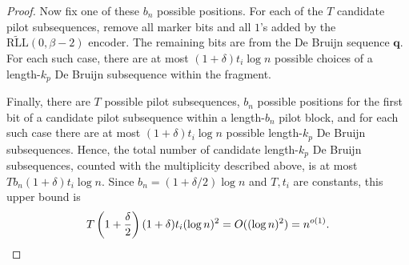 \documentclass[journal,letterpaper,onecolumn,11pt]{IEEEtran}
\newcommand{\boldq}{\mathbf{q}}
\begin{document}
\begin{proof}
Now fix one of these \(b_n\) possible positions.
For each of the \(T\) candidate pilot subsequences, remove all marker
bits and all \(1\)'s added by the
\(\widetilde{\mathrm{RLL}}(0,\beta-2)\) encoder.
The remaining bits are from the De Bruijn sequence \(\boldq\).
For each such case, there are at most
\((1+\delta)t_i\log n\) possible choices of a length-\(k_p\)
De Bruijn subsequence within the fragment.

Finally, there are \(T\) possible pilot subsequences, \(b_n\) possible
positions for the first bit of a candidate pilot subsequence within a
length-\(b_n\) pilot block, and for each such case there are at most
\((1+\delta)t_i\log n\) possible length-\(k_p\) De Bruijn subsequences.
Hence, the total number of candidate length-\(k_p\) De Bruijn
subsequences, counted with the multiplicity described above, is at most
$
Tb_n(1+\delta)t_i\log n.
$
Since \(b_n=(1+\delta/2)\log n\) and \(T,t_i\) are constants, this upper
bound is
\[
T\left(1+\frac{\delta}{2}\right)(1+\delta)t_i(\log n)^2
=
O((\log n)^2)
=
n^{o(1)}.\qedhere
\]
\end{proof}
\end{document}
